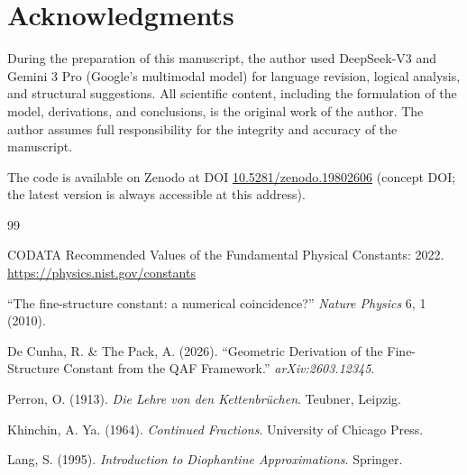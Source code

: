 \documentclass[12pt]{article}
\begin{document}
\section*{Acknowledgments}

During the preparation of this manuscript, the author used DeepSeek-V3 and Gemini 3 Pro (Google's multimodal model) for language revision, logical analysis, and structural suggestions. All scientific content, including the formulation of the model, derivations, and conclusions, is the original work of the author. The author assumes full responsibility for the integrity and accuracy of the manuscript.

The code is available on Zenodo at DOI \href{https://doi.org/10.5281/zenodo.19802606}{10.5281/zenodo.19802606} (concept DOI; the latest version is always accessible at this address).

\begin{thebibliography}{99}

CODATA Recommended Values of the Fundamental Physical Constants: 2022. \url{https://physics.nist.gov/constants}

``The fine-structure constant: a numerical coincidence?'' \textit{Nature Physics} 6, 1 (2010).

De Cunha, R. \& The Pack, A. (2026). ``Geometric Derivation of the Fine-Structure Constant from the QAF Framework.'' \textit{arXiv:2603.12345}.

Perron, O. (1913). \textit{Die Lehre von den Kettenbrüchen}. Teubner, Leipzig.

Khinchin, A. Ya. (1964). \textit{Continued Fractions}. University of Chicago Press.

Lang, S. (1995). \textit{Introduction to Diophantine Approximations}. Springer.

\end{thebibliography}
\end{document}
